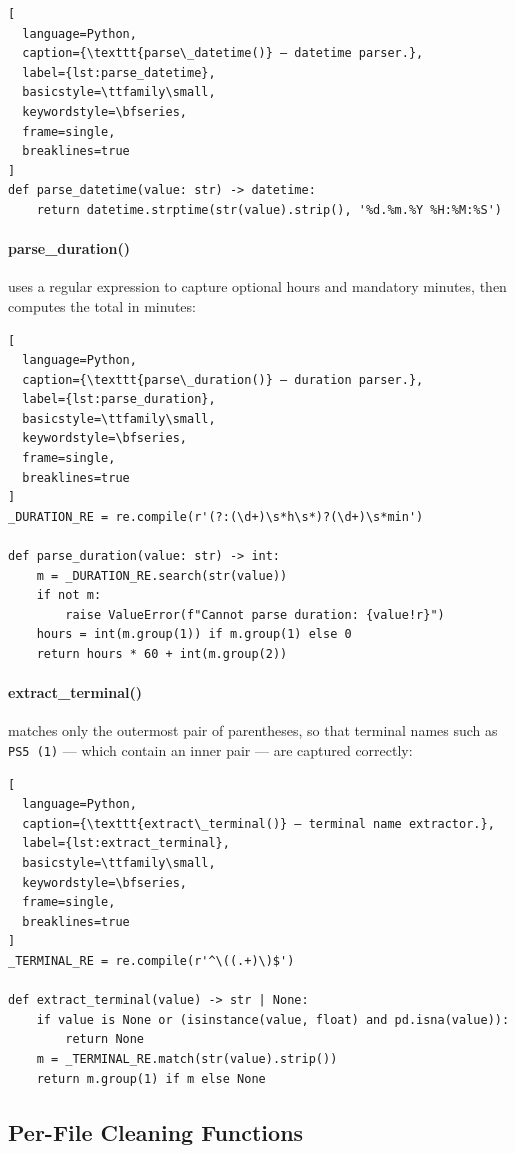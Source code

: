\begin{lstlisting}[
  language=Python,
  caption={\texttt{parse\_datetime()} — datetime parser.},
  label={lst:parse_datetime},
  basicstyle=\ttfamily\small,
  keywordstyle=\bfseries,
  frame=single,
  breaklines=true
]
def parse_datetime(value: str) -> datetime:
    return datetime.strptime(str(value).strip(), '%d.%m.%Y %H:%M:%S')
\end{lstlisting}

\paragraph{parse\_duration()} uses a regular expression to capture optional hours
and mandatory minutes, then computes the total in minutes:

\begin{lstlisting}[
  language=Python,
  caption={\texttt{parse\_duration()} — duration parser.},
  label={lst:parse_duration},
  basicstyle=\ttfamily\small,
  keywordstyle=\bfseries,
  frame=single,
  breaklines=true
]
_DURATION_RE = re.compile(r'(?:(\d+)\s*h\s*)?(\d+)\s*min')

def parse_duration(value: str) -> int:
    m = _DURATION_RE.search(str(value))
    if not m:
        raise ValueError(f"Cannot parse duration: {value!r}")
    hours = int(m.group(1)) if m.group(1) else 0
    return hours * 60 + int(m.group(2))
\end{lstlisting}

\paragraph{extract\_terminal()} matches only the outermost pair of parentheses,
so that terminal names such as \texttt{PS5\,(1)} — which contain an inner pair —
are captured correctly:

\begin{lstlisting}[
  language=Python,
  caption={\texttt{extract\_terminal()} — terminal name extractor.},
  label={lst:extract_terminal},
  basicstyle=\ttfamily\small,
  keywordstyle=\bfseries,
  frame=single,
  breaklines=true
]
_TERMINAL_RE = re.compile(r'^\((.+)\)$')

def extract_terminal(value) -> str | None:
    if value is None or (isinstance(value, float) and pd.isna(value)):
        return None
    m = _TERMINAL_RE.match(str(value).strip())
    return m.group(1) if m else None
\end{lstlisting}

\subsection{Per-File Cleaning Functions}

